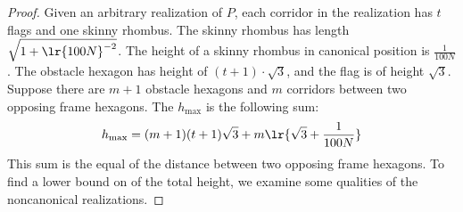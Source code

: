 
\begin{proof}




































































































Given an arbitrary realization of $P$, each corridor in the realization has $t$ flags and one skinny rhombus. 
The skinny rhombus  has length $\sqrt{1 + \lr{100N}^{-2}}$.
The height of a skinny rhombus in canonical position is $\frac{1}{100N}$.
The obstacle hexagon has height of $ (t+1) \cdot \sqrt{3}$, and the flag is of height $\sqrt{3}$.  
Suppose there are $m+1$ obstacle hexagons and $m$ corridors between two opposing frame hexagons. 
The  $h_\text{max}$ is the following sum:
$$h_\text{max} = (m+1) (t+1) \sqrt{3} + m \lr{\sqrt{3}+ \frac{1}{100N}}$$
This sum is the equal of the distance between two opposing frame hexagons.%
To find a lower bound on of the total height, we examine some qualities of the noncanonical realizations.


\end{proof}
